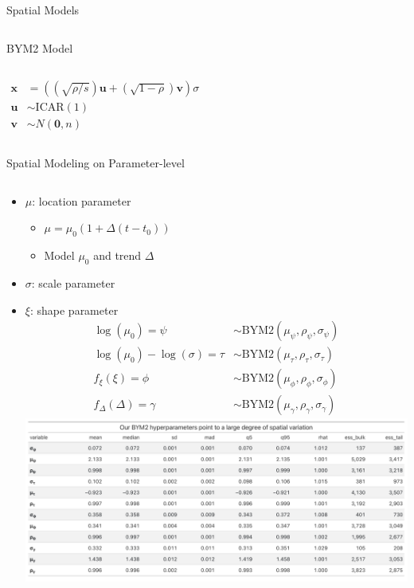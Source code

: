 \documentclass[
  ignorenonframetext,
]{beamer}
\providecommand{\tightlist}{%
  \setlength{\itemsep}{0pt}\setlength{\parskip}{0pt}}\usepackage{longtable,booktabs,array}
\begin{document}
\begin{frame}{Spatial Models}
\begin{columns}[T]
\begin{block}{BYM2 Model}
\begin{column}{0.5\textwidth}
\[
\begin{aligned}
\mathbf{x} &= \left(\left(\sqrt{\rho/s}\right)\mathbf{u} + \left(\sqrt{1 - \rho}\right) \mathbf{v} \right)\sigma \\
\mathbf{u} &\sim \mathrm{ICAR}(1) \\
\mathbf{v} &\sim N(\mathbf{0}, n)
\end{aligned}
\]
\end{column}
\end{block}
\end{columns}
\end{frame}

\begin{frame}{Spatial Modeling on Parameter-level}
\label{spatial-modeling-on-parameter-level}
\begin{columns}[T]
\begin{column}{0.5\textwidth}
\begin{itemize}
\tightlist
\item
  \(\mu\): location parameter

  \begin{itemize}
  \tightlist
  \item
    \(\mu = \mu_0 \left(1 + \Delta \left(t - t_0\right)\right)\)
  \item
    Model \(\mu_0\) and trend \(\Delta\)
  \end{itemize}
\item
  \(\sigma\): scale parameter
\item
  \(\xi\): shape parameter \[
  \begin{aligned}
  \log(\mu_0) = \psi &\sim \mathrm{BYM2}(\mu_\psi, \rho_\psi, \sigma_\psi) \\
  \log(\mu_0) - \log(\sigma) = \tau &\sim \mathrm{BYM2}(\mu_\tau, \rho_\tau, \sigma_\tau) \\
  f_\xi(\xi) = \phi &\sim \mathrm{BYM2}(\mu_\phi, \rho_\phi, \sigma_\phi) \\
  f_\Delta(\Delta) = \gamma &\sim \mathrm{BYM2}(\mu_\gamma, \rho_\gamma, \sigma_\gamma)
  \end{aligned}
  \] \includegraphics{images/bym_table.png}
\end{itemize}
\end{column}


\end{columns}
\end{frame}
\end{document}
